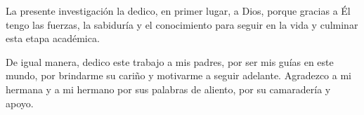 \clearpage
{}
\vspace*{\fill}
\hfill\begin{minipage}{0.72\textwidth}\setlength{\parskip}{12pt}\setlength{\parindent}{0pt}
La presente investigación la dedico, en primer lugar, a Dios, porque gracias a Él
tengo las fuerzas, la sabiduría y el conocimiento para seguir en la vida y culminar
esta etapa académica.

De igual manera, dedico este trabajo a mis padres, por ser mis guías en este mundo,
por brindarme su cariño y motivarme a seguir adelante. Agradezco a mi hermana y a mi
hermano por sus palabras de aliento, por su camaradería y apoyo.
\end{minipage}
\vspace{4mm}
